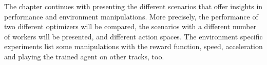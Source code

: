 The chapter continues with presenting the different scenarios that offer insights in performance and environment manipulations. More precisely, the performance of two different optimizers will be compared, the scenarios with a different number of workers will be presented, and different action spaces. The environment specific experiments list some manipulations with the reward function, speed, acceleration and playing the trained agent on other tracks, too.








